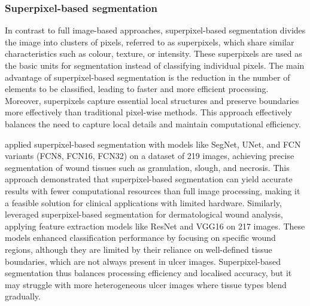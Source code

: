 \subsubsection{Superpixel-based segmentation}
In contrast to full image-based approaches, superpixel-based segmentation divides the image into clusters of pixels, referred to as superpixels, which share similar characteristics such as colour, texture, or intensity. These superpixels are used as the basic units for segmentation instead of classifying individual pixels. The main advantage of superpixel-based segmentation is the reduction in the number of elements to be classified, leading to faster and more efficient processing. Moreover, superpixels capture essential local structures and preserve boundaries more effectively than traditional pixel-wise methods. This approach effectively balances the need to capture local details and maintain computational efficiency.

\citet{RW24niri2021superpixel} applied superpixel-based segmentation with models like SegNet, UNet, and FCN variants (FCN8, FCN16, FCN32) on a dataset of 219 images, achieving precise segmentation of wound tissues such as granulation, slough, and necrosis. This approach demonstrated that superpixel-based segmentation can yield accurate results with fewer computational resources than full image processing, making it a feasible solution for clinical applications with limited hardware.
Similarly,~\citet{RW29blanco2020superpixel} leveraged superpixel-based segmentation for dermatological wound analysis, applying feature extraction models like ResNet and VGG16 on 217 images. These models enhanced classification performance by focusing on specific wound regions, although they are limited by their reliance on well-defined tissue boundaries, which are not always present in ulcer images. Superpixel-based segmentation thus balances processing efficiency and localised accuracy, but it may struggle with more heterogeneous ulcer images where tissue types blend gradually. 

